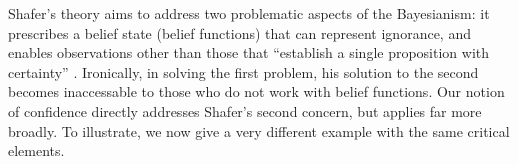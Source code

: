 Shafer's theory aims to address two problematic aspects of the Bayesianism:
it prescribes a belief state (belief functions) that can represent ignorance, and enables observations other than those that ``establish a single proposition with certainty'' \parencite[Chapter 1: \S7,\S8]{shafer1976mathematical}.
Ironically, in solving the first problem, his solution to the second becomes inaccessable to those who do not work with belief functions. 
%
Our notion of confidence directly addresses Shafer's second concern, but applies far more broadly.
To illustrate, we now give a very different example with the same critical elements.

